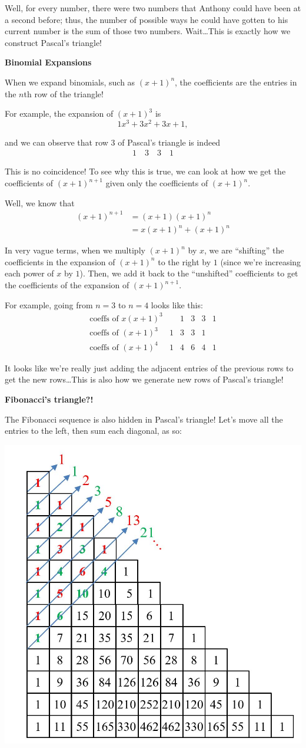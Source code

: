 \documentclass{article}
\begin{document}
Well, for every number, there were two numbers that Anthony could have been at a second before; thus, the number of possible ways he could have gotten to his current number is the sum of those two numbers. Wait\dots This is exactly how we construct Pascal's triangle!

\textbf{Binomial Expansions}

When we expand binomials, such as $(x+1)^n$, the coefficients are the entries in the $n$th row of the triangle! 

For example, the expansion of $(x+1)^3$ is 
\[1x^3+3x^2+3x+1,\]

and we can observe that row $3$ of Pascal's triangle is indeed 
\[
	\begin{array}{c}1\quad3\quad3\quad1\end{array}
\]

This is no coincidence! To see why this is true, we can look at how we get the coefficients of $(x+1)^{n+1}$ given only the coefficients of $(x+1)^n$.

Well, we know that
\begin{align*}
	(x+1)^{n+1}&=(x+1)(x+1)^n \\
			   &= x(x+1)^n+(x+1)^n
\end{align*}

In very vague terms, when we multiply $(x+1)^n$ by $x$, we are ``shifting'' the coefficients in the expansion of $(x+1)^n$ to the right by $1$ (since we're increasing each power of $x$ by $1$). Then, we add it back to the ``unshifted'' coefficients to get the coefficients of the expansion of $(x+1)^{n+1}$. 

For example, going from $n=3$ to $n=4$ looks like this:
\[
\begin{array}{c|ccccc}
\text{coeffs of } x(x+1)^3 & &1&3&3&1 \\
\text{coeffs of } (x+1)^3 & 1&3&3&1& \\
\hline
\text{coeffs of } (x+1)^4 & 1&4&6&4&1
\end{array}
\]

It looks like we're really just adding the adjacent entries of the previous rows to get the new rows\dots This is also how we generate new rows of Pascal's triangle! 

\textbf{Fibonacci's triangle?!}

The Fibonacci sequence is also hidden in Pascal's triangle! Let's move all the entries to the left, then sum each diagonal, as so:

\begin{center}
	\includegraphics[width = 2 in]{images/pascal1.png}
\end{center}
\end{document}
